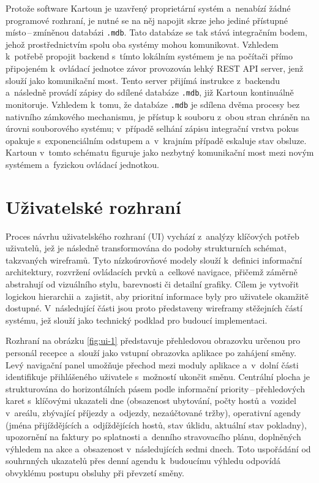 Protože software Kartoun je uzavřený proprietární systém a~nenabízí žádné programové rozhraní, je nutné se na něj napojit skrze jeho jediné přístupné místo\,--\,zmíněnou databázi \texttt{.mdb}.
Tato databáze se tak stává integračním bodem, jehož prostřednictvím spolu oba systémy mohou komunikovat.
Vzhledem k~potřebě propojit backend s~tímto lokálním systémem je na počítači přímo připojeném k~ovládací jednotce závor provozován lehký REST API server, jenž slouží jako komunikační most.
Tento server přijímá instrukce z~backendu a~následně provádí zápisy do sdílené databáze \texttt{.mdb}, již Kartoun kontinuálně monitoruje.
Vzhledem k~tomu, že databáze \texttt{.mdb} je sdílena dvěma procesy bez nativního zámkového mechanismu, je přístup k souboru z~obou stran chráněn na úrovni souborového systému; v~případě selhání zápisu integrační vrstva pokus opakuje s~exponenciálním odstupem a~v~krajním případě eskaluje stav obsluze.
Kartoun v~tomto schématu figuruje jako nezbytný komunikační most mezi novým systémem a~fyzickou ovládací jednotkou.

\section{Uživatelské rozhraní}
Proces návrhu uživatelského rozhraní (UI) vychází z~analýzy klíčových potřeb uživatelů, jež je následně transformována do podoby strukturních schémat, takzvaných wireframů.
Tyto nízkoúrovňové modely slouží k~definici informační architektury, rozvržení ovládacích prvků a~celkové navigace, přičemž záměrně abstrahují od vizuálního stylu, barevnosti či detailní grafiky.
Cílem je vytvořit logickou hierarchii a~zajistit, aby prioritní informace byly pro uživatele okamžitě dostupné.
V~následující části jsou proto představeny wireframy stěžejních částí systému, jež slouží jako technický podklad pro budoucí implementaci.

Rozhraní na obrázku \ref{fig:ui-1} představuje přehledovou obrazovku určenou pro personál recepce a~slouží jako vstupní obrazovka aplikace po zahájení směny.
Levý navigační panel umožňuje přechod mezi moduly aplikace a~v~dolní části identifikuje přihlášeného uživatele s~možností ukončit směnu.
Centrální plocha je strukturována do horizontálních pásem podle informační priority\,--\,přehledových karet s~klíčovými ukazateli dne (obsazenost ubytování, počty hostů a~vozidel v~areálu, zbývající příjezdy a~odjezdy, nezaúčtované tržby), operativní agendy (jména přijíždějících a~odjíždějících hostů, stav úklidu, aktuální stav pokladny), upozornění na faktury po splatnosti a~denního stravovacího plánu, doplněných výhledem na akce a~obsazenost v~následujících sedmi dnech.
Toto uspořádání od souhrnných ukazatelů přes denní agendu k~budoucímu výhledu odpovídá obvyklému postupu obsluhy při převzetí směny.

